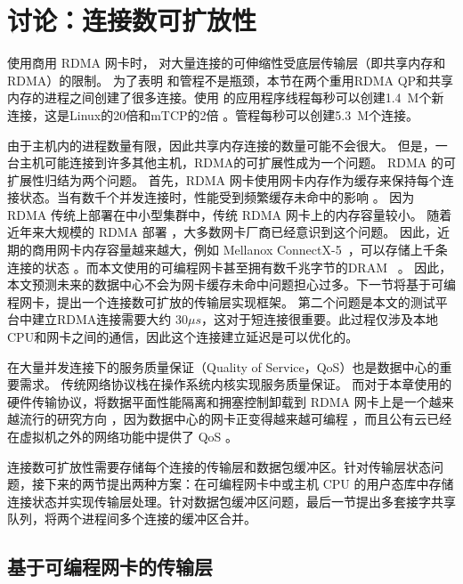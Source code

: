 \section{讨论：连接数可扩放性}
\label{socksdirect:sec:discussion}


使用商用 RDMA 网卡时，\sys {} 对大量连接的可伸缩性受底层传输层（即共享内存和RDMA）的限制。
为了表明 \libipc {} 和管程不是瓶颈，本节在两个重用RDMA QP和共享内存的进程之间创建了很多连接。使用 \libipc {} 的应用程序线程每秒可以创建1.4~M个新连接，这是Linux的20倍和mTCP的2倍 \cite {jeong2014mtcp}。管程每秒可以创建5.3~M个连接。

由于主机内的进程数量有限，因此共享内存连接的数量可能不会很大。
但是，一台主机可能连接到许多其他主机，RDMA的可扩展性成为一个问题。
RDMA 的可扩展性归结为两个问题。
首先，RDMA 网卡使用网卡内存作为缓存来保持每个连接状态。当有数千个并发连接时，性能受到频繁缓存未命中的影响 \cite {mprdma,kaminsky2016design,kalia2018datacenter}。
因为 RDMA 传统上部署在中小型集群中，传统 RDMA 网卡上的内存容量较小。
随着近年来大规模的 RDMA 部署 \cite {guo2016rdma}，大多数网卡厂商已经意识到这个问题。
因此，近期的商用网卡内存容量越来越大，例如 Mellanox ConnectX-5~\cite{connectx-5}，可以存储上千条连接的状态 \cite {kalia2018datacenter}。而本文使用的可编程网卡甚至拥有数千兆字节的DRAM~ \cite {mellanox-innova,mellanox-bluefield,smartnic}。
因此，本文预测未来的数据中心不会为网卡缓存未命中问题担心过多。下一节将基于可编程网卡，提出一个连接数可扩放的传输层实现框架。
第二个问题是本文的测试平台中建立RDMA连接需要大约 $30 \mu s$，这对于短连接很重要。此过程仅涉及本地CPU和网卡之间的通信，因此这个连接建立延迟是可以优化的。

在大量并发连接下的服务质量保证（Quality of Service，QoS）也是数据中心的重要需求。
传统网络协议栈在操作系统内核实现服务质量保证。
而对于本章使用的硬件传输协议，将数据平面性能隔离和拥塞控制卸载到 RDMA 网卡上是一个越来越流行的研究方向 \cite {peter2016arrakis,zhu2015congestion,lu2017memory,mprdma,mittal2018revisiting}，因为数据中心的网卡正变得越来越可编程  \cite{smartnic,cavium,kaufmann2015flexnic,mellanox-innova,mellanox-bluefield}，而且公有云已经在虚拟机之外的网络功能中提供了 QoS \cite {li2016clicknp,panda2016netbricks,floem-osdi18}。

连接数可扩放性需要存储每个连接的传输层和数据包缓冲区。针对传输层状态问题，接下来的两节提出两种方案：在可编程网卡中或主机 CPU 的用户态库中存储连接状态并实现传输层处理。针对数据包缓冲区问题，最后一节提出多套接字共享队列，将两个进程间多个连接的缓冲区合并。

\subsection{基于可编程网卡的传输层}
\label{socksdirect:sec:smartnic}

